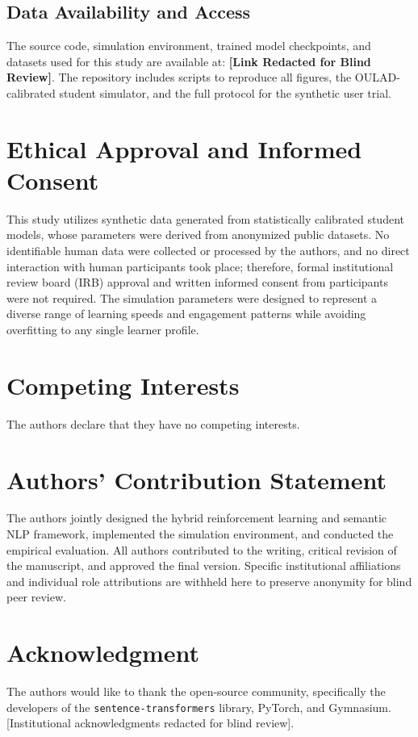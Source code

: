 \documentclass[conference]{IEEEtran}
\begin{document}
\subsection*{Data Availability and Access}
The source code, simulation environment, trained model checkpoints, and datasets used for this study are available at: \textbf{[Link Redacted for Blind Review]}. The repository includes scripts to reproduce all figures, the OULAD-calibrated student simulator, and the full protocol for the synthetic user trial.

\section*{Ethical Approval and Informed Consent}
This study utilizes synthetic data generated from statistically calibrated student models, whose parameters were derived from anonymized public datasets. No identifiable human data were collected or processed by the authors, and no direct interaction with human participants took place; therefore, formal institutional review board (IRB) approval and written informed consent from participants were not required. The simulation parameters were designed to represent a diverse range of learning speeds and engagement patterns while avoiding overfitting to any single learner profile.

\section*{Competing Interests}
The authors declare that they have no competing interests.

\section*{Authors' Contribution Statement}
The authors jointly designed the hybrid reinforcement learning and semantic NLP framework, implemented the simulation environment, and conducted the empirical evaluation. All authors contributed to the writing, critical revision of the manuscript, and approved the final version. Specific institutional affiliations and individual role attributions are withheld here to preserve anonymity for blind peer review.

\section*{Acknowledgment}
The authors would like to thank the open-source community, specifically the developers of the \texttt{sentence-transformers} library, PyTorch, and Gymnasium. [Institutional acknowledgments redacted for blind review].
\end{document}
